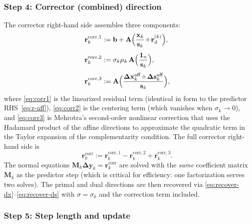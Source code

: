 \documentclass[11pt,twoside]{article}
\newcommand{\bA}{\mathbf{A}}
\newcommand{\bb}{\mathbf{b}}
\newcommand{\bx}{\mathbf{x}}
\newcommand{\by}{\mathbf{y}}
\newcommand{\bs}{\mathbf{s}}
\newcommand{\bM}{\mathbf{M}}
\newcommand{\br}{\mathbf{r}}
\newcommand{\bDelta}{\mathbf{\Delta}}
\begin{document}
\subsubsection{Step 4: Corrector (combined) direction}

The corrector right-hand side assembles three components:
\begin{align}
  \br_k^{\text{corr},1} &:= \bb
    + \bA\Bigl(\frac{\bx_k}{\bs_k} \circ \br_d^{(k)}\Bigr),
    \label{eq:corr1} \\[4pt]
  \br_k^{\text{corr},2} &:= \sigma_k\mu_k\,
    \bA\Bigl(\frac{\mathbf{1}_n}{\bs_k}\Bigr),
    \label{eq:corr2} \\[4pt]
  \br_k^{\text{corr},3} &:=
    \bA\Bigl(\frac{\bDelta\bx_k^{\text{aff}}
                 \circ \bDelta\bs_k^{\text{aff}}}{\bs_k}\Bigr),
    \label{eq:corr3}
\end{align}
where \eqref{eq:corr1} is the linearized residual term (identical in form
to the predictor RHS~\eqref{eq:r-aff}), \eqref{eq:corr2} is the centering
term (which vanishes when $\sigma_k \to 0$), and \eqref{eq:corr3} is
Mehrotra's second-order nonlinear correction that uses the
Hadamard product of the affine directions to approximate the quadratic
term in the Taylor expansion of the complementarity condition.  The
full corrector right-hand side is
\begin{equation}
  \br_k^{\text{corr}} :=
    \br_k^{\text{corr},1}
    - \br_k^{\text{corr},2}
    + \br_k^{\text{corr},3}.
  \label{eq:corr-rhs}
\end{equation}
The normal equations $\bM_k\bDelta\by_k = \br_k^{\text{corr}}$ are solved
with the \emph{same} coefficient matrix $\bM_k$ as the predictor step
(which is critical for efficiency: one factorization serves two solves).
The primal and dual directions are then recovered via
\eqref{eq:recover-dx}--\eqref{eq:recover-ds} with $\sigma = \sigma_k$ and
the correction term included.

\subsubsection{Step 5: Step length and update}
\end{document}
